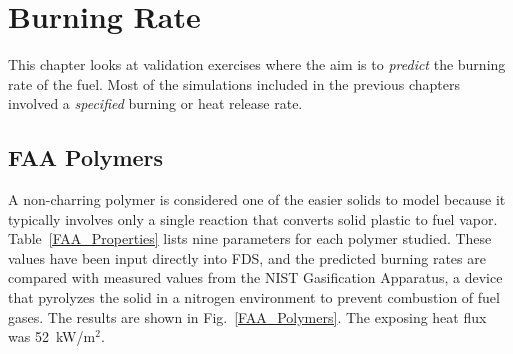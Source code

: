 
\chapter{Burning Rate}

This chapter looks at validation exercises where the aim is to {\em predict} the burning rate of the fuel. Most of the simulations included in the previous chapters involved
a {\em specified} burning or heat release rate. 


\section{FAA Polymers}

A non-charring polymer is considered one of the easier solids to model because it typically involves only a single reaction that converts solid plastic to fuel vapor. Table~\ref{FAA_Properties}
lists nine parameters for each polymer studied. These values have been input directly into FDS, and the predicted burning rates are compared with measured values from the NIST 
Gasification Apparatus, a device that pyrolyzes the solid in a nitrogen environment to prevent combustion of fuel gases. The results are shown in Fig.~\ref{FAA_Polymers}. The exposing
heat flux was 52~kW/m$^2$.

